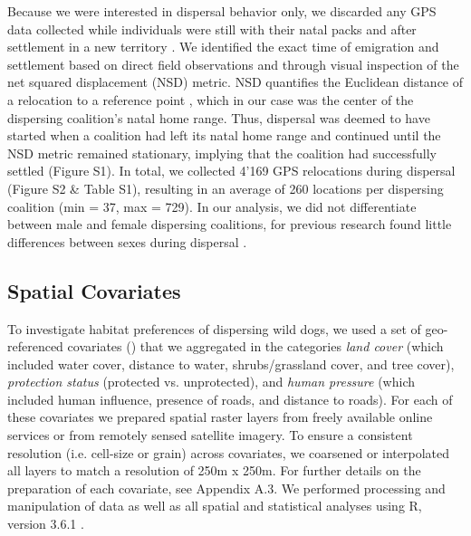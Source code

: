 \documentclass[abstract=on,10pt,a4paper,bibliography=totocnumbered]{article}
\begin{document}
Because we were interested in dispersal behavior only, we discarded any GPS data
collected while individuals were still with their natal packs and after
settlement in a new territory \citep{Cozzi.2020}. We identified the exact time
of emigration and settlement based on direct field observations and through
visual inspection of the net squared displacement (NSD) metric. NSD quantifies
the Euclidean distance of a relocation to a reference point \citep{Borger.2012},
which in our case was the center of the dispersing coalition's natal home range.
Thus, dispersal was deemed to have started when a coalition had left its natal
home range and continued until the NSD metric remained stationary, implying that
the coalition had successfully settled (Figure S1). In total, we collected 4'169
GPS relocations during dispersal (Figure S2 \& Table S1), resulting in an
average of 260 locations per dispersing coalition (min = 37, max = 729). In our
analysis, we did not differentiate between male and female dispersing
coalitions, for previous research found little differences between sexes during
dispersal \citep{Woodroffe.2019, Cozzi.2020}.

\subsection{Spatial Covariates}
To investigate habitat preferences of dispersing wild dogs, we used a set of
geo-referenced covariates () that we aggregated in the
categories \textit{land cover} (which included water cover, distance to water,
shrubs/grassland cover, and tree cover), \textit{protection status} (protected
vs. unprotected), and \textit{human pressure} (which included human influence,
presence of roads, and distance to roads). For each of these covariates we
prepared spatial raster layers from freely available online services or from
remotely sensed satellite imagery. To ensure a consistent resolution (i.e.
cell-size or grain) across covariates, we coarsened or interpolated all layers
to match a resolution of 250m x 250m. For further details on the preparation of
each covariate, see Appendix A.3. We performed processing and manipulation of
data as well as all spatial and statistical analyses using R, version 3.6.1
\citep{R.2019}.
\end{document}

